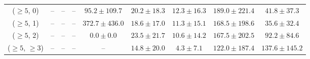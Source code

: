 \begin{table}[h!]
{\begin{tabular}{ccccccccc}
	($\ge5$, 0) & -- & -- & -- & $95.2\pm 109.7$ & $20.2\pm 18.3$ & $12.3\pm 16.3$ & $189.0\pm 221.4$ & $41.8\pm 37.3$ \\[0.5ex] 
	($\ge5$, 1) & -- & -- & -- & $372.7\pm 436.0$ & $18.6\pm 17.0$ & $11.3\pm 15.1$ & $168.5\pm 198.6$ & $35.6\pm 32.4$ \\[0.5ex] 
	($\ge5$, 2) & -- & -- & -- & $0.0\pm 0.0$ & $23.5\pm 21.7$ & $10.6\pm 14.2$ & $167.5\pm 202.5$ & $92.2\pm 84.6$ \\[0.5ex] 
	($\ge5$, $\ge3$) & -- & -- & -- & -- & $14.8\pm 20.0$ & $4.3\pm 7.1$ & $122.0\pm 187.4$ & $137.6\pm 145.2$ \\[0.5ex] 
	\hline
	\hline
\end{tabular}}
\end{table}

